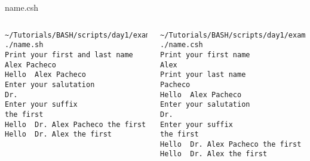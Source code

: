 \documentclass[10pt,t]{beamer}
\begin{document}
\begin{frame}
{\begin{columns}
\begin{block}{name.csh}
        
      \end{block}
    \end{columns}
    \begin{columns}
        \begin{lstlisting}[style=LINUX,basicstyle=\fontsize{3.5}{4.5}\selectfont\ttfamily]
~/Tutorials/BASH/scripts/day1/examples> ./name.sh 
Print your first and last name
Alex Pacheco
Hello  Alex Pacheco
Enter your salutation
Dr.
Enter your suffix
the first
Hello  Dr. Alex Pacheco the first
Hello  Dr. Alex the first
        \end{lstlisting}
        \begin{lstlisting}[style=LINUX,basicstyle=\fontsize{3.5}{4.5}\selectfont\ttfamily]
~/Tutorials/BASH/scripts/day1/examples> ./name.csh 
Print your first name
Alex
Print your last name
Pacheco
Hello  Alex Pacheco
Enter your salutation
Dr.
Enter your suffix
the first
Hello  Dr. Alex Pacheco the first
Hello  Dr. Alex the first
        \end{lstlisting}
    \end{columns}
  }
\end{frame}
\end{document}
